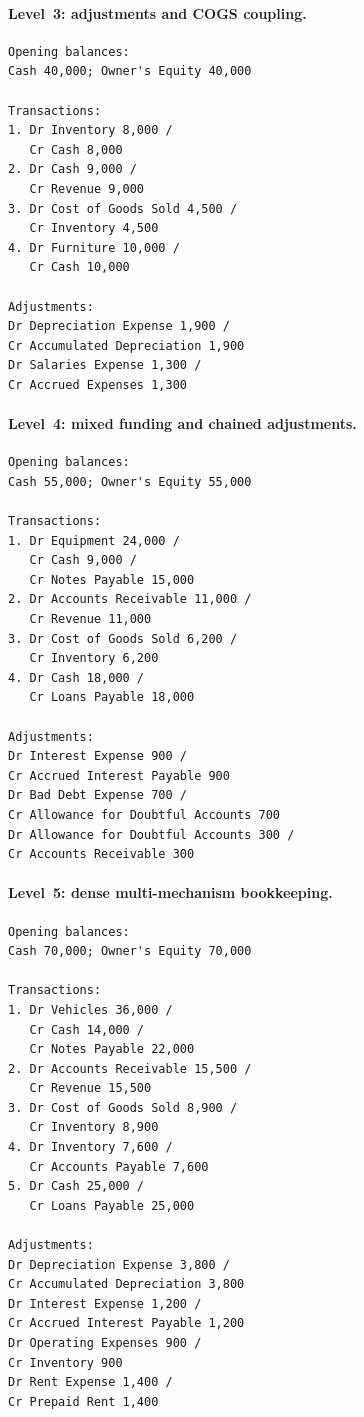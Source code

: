 \paragraph{Level~3: adjustments and COGS coupling.}
\begin{verbatim}
Opening balances:
Cash 40,000; Owner's Equity 40,000

Transactions:
1. Dr Inventory 8,000 /
   Cr Cash 8,000
2. Dr Cash 9,000 /
   Cr Revenue 9,000
3. Dr Cost of Goods Sold 4,500 /
   Cr Inventory 4,500
4. Dr Furniture 10,000 /
   Cr Cash 10,000

Adjustments:
Dr Depreciation Expense 1,900 /
Cr Accumulated Depreciation 1,900
Dr Salaries Expense 1,300 /
Cr Accrued Expenses 1,300
\end{verbatim}

\paragraph{Level~4: mixed funding and chained adjustments.}
\begin{verbatim}
Opening balances:
Cash 55,000; Owner's Equity 55,000

Transactions:
1. Dr Equipment 24,000 /
   Cr Cash 9,000 /
   Cr Notes Payable 15,000
2. Dr Accounts Receivable 11,000 /
   Cr Revenue 11,000
3. Dr Cost of Goods Sold 6,200 /
   Cr Inventory 6,200
4. Dr Cash 18,000 /
   Cr Loans Payable 18,000

Adjustments:
Dr Interest Expense 900 /
Cr Accrued Interest Payable 900
Dr Bad Debt Expense 700 /
Cr Allowance for Doubtful Accounts 700
Dr Allowance for Doubtful Accounts 300 /
Cr Accounts Receivable 300
\end{verbatim}

\paragraph{Level~5: dense multi-mechanism bookkeeping.}
\begin{verbatim}
Opening balances:
Cash 70,000; Owner's Equity 70,000

Transactions:
1. Dr Vehicles 36,000 /
   Cr Cash 14,000 /
   Cr Notes Payable 22,000
2. Dr Accounts Receivable 15,500 /
   Cr Revenue 15,500
3. Dr Cost of Goods Sold 8,900 /
   Cr Inventory 8,900
4. Dr Inventory 7,600 /
   Cr Accounts Payable 7,600
5. Dr Cash 25,000 /
   Cr Loans Payable 25,000

Adjustments:
Dr Depreciation Expense 3,800 /
Cr Accumulated Depreciation 3,800
Dr Interest Expense 1,200 /
Cr Accrued Interest Payable 1,200
Dr Operating Expenses 900 /
Cr Inventory 900
Dr Rent Expense 1,400 /
Cr Prepaid Rent 1,400
\end{verbatim}

